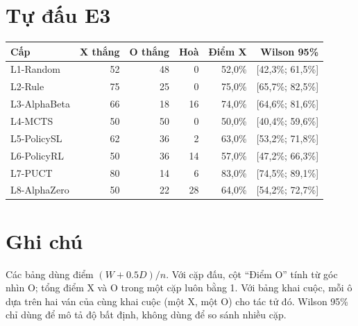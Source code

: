\section{Tự đấu E3}
\begin{small}
\begin{tabular}{@{}lrrrrr@{}}
\toprule
Cấp & X thắng & O thắng & Hoà & Điểm X & Wilson 95\% \\
\midrule
L1-Random & 52 & 48 & 0 & 52,0\% & [42,3\%; 61,5\%] \\
L2-Rule & 75 & 25 & 0 & 75,0\% & [65,7\%; 82,5\%] \\
L3-AlphaBeta & 66 & 18 & 16 & 74,0\% & [64,6\%; 81,6\%] \\
L4-MCTS & 50 & 50 & 0 & 50,0\% & [40,4\%; 59,6\%] \\
L5-PolicySL & 62 & 36 & 2 & 63,0\% & [53,2\%; 71,8\%] \\
L6-PolicyRL & 50 & 36 & 14 & 57,0\% & [47,2\%; 66,3\%] \\
L7-PUCT & 80 & 14 & 6 & 83,0\% & [74,5\%; 89,1\%] \\
L8-AlphaZero & 50 & 22 & 28 & 64,0\% & [54,2\%; 72,7\%] \\
\bottomrule
\end{tabular}
\end{small}
\section{Ghi chú}
Các bảng dùng điểm $(W+0.5D)/n$. Với cặp đấu, cột ``Điểm O'' tính từ góc nhìn O; tổng điểm X và O trong một cặp luôn bằng 1. Với bảng khai cuộc, mỗi ô dựa trên hai ván của cùng khai cuộc (một X, một O) cho tác tử đó. Wilson 95\% chỉ dùng để mô tả độ bất định, không dùng để so sánh nhiều cặp.